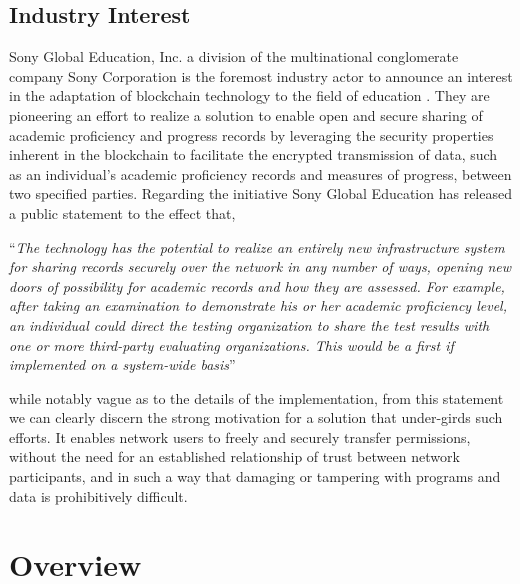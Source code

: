 \subsection{Industry Interest}

Sony Global Education, Inc. a division of the multinational conglomerate company Sony Corporation is the foremost industry actor to announce an interest in the adaptation of blockchain technology to the field of education \cite{sonyglobaleducation2016}.
They are pioneering an effort to realize a solution to enable open and secure sharing of academic proficiency and progress records by leveraging the security properties inherent in the blockchain to facilitate the encrypted transmission of data, such as an individual's academic proficiency records and measures of progress, between two specified parties.
Regarding the initiative Sony Global Education has released a public statement to the effect that,

\begin{displayquote}
``\textit{The technology has the potential to realize an entirely new infrastructure system for sharing records securely over the network in any number of ways, opening new doors of possibility for academic records and how they are assessed. For example, after taking an examination to demonstrate his or her academic proficiency level, an individual could direct the testing organization to share the test results with one or more third-party evaluating organizations. This would be a first if implemented on a system-wide basis}''
\end{displayquote}

while notably vague as to the details of the implementation, from this statement we can clearly discern the strong motivation for a solution that under-girds such efforts. 
It enables network users to freely and securely transfer permissions, without the need for an established relationship of trust between network participants, and in such a way that damaging or tampering with programs and data is prohibitively difficult.


\section{Overview}

